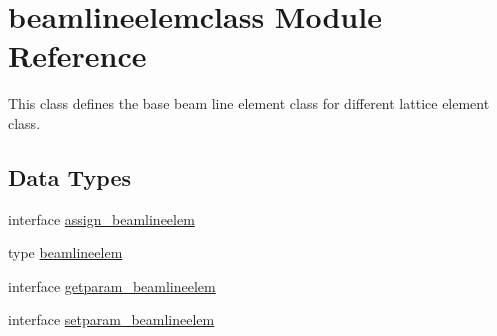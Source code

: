 \hypertarget{namespacebeamlineelemclass}{}\section{beamlineelemclass Module Reference}
\label{namespacebeamlineelemclass}


This class defines the base beam line element class for different lattice element class.  


\subsection*{Data Types}
\begin{DoxyCompactItemize}
\item 
interface \mbox{\hyperlink{interfacebeamlineelemclass_1_1assign__beamlineelem}{assign\+\_\+beamlineelem}}
\item 
type \mbox{\hyperlink{namespacebeamlineelemclass_structbeamlineelemclass_1_1beamlineelem}{beamlineelem}}
\item 
interface \mbox{\hyperlink{interfacebeamlineelemclass_1_1getparam__beamlineelem}{getparam\+\_\+beamlineelem}}
\item 
interface \mbox{\hyperlink{interfacebeamlineelemclass_1_1setparam__beamlineelem}{setparam\+\_\+beamlineelem}}
\end{DoxyCompactItemize}

